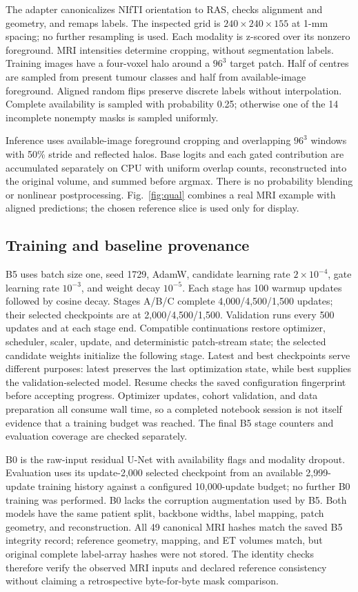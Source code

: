 \documentclass[conference]{IEEEtran}
\begin{document}
The adapter canonicalizes NIfTI orientation to RAS, checks alignment and geometry, and remaps labels. The inspected grid is $240\times240\times155$ at 1-mm spacing; no further resampling is used. Each modality is z-scored over its nonzero foreground. MRI intensities determine cropping, without segmentation labels. Training images have a four-voxel halo around a $96^3$ target patch. Half of centres are sampled from present tumour classes and half from available-image foreground. Aligned random flips preserve discrete labels without interpolation. Complete availability is sampled with probability 0.25; otherwise one of the 14 incomplete nonempty masks is sampled uniformly.

Inference uses available-image foreground cropping and overlapping $96^3$ windows with 50\% stride and reflected halos. Base logits and each gated contribution are accumulated separately on CPU with uniform overlap counts, reconstructed into the original volume, and summed before argmax. There is no probability blending or nonlinear postprocessing. Fig.~\ref{fig:qual} combines a real MRI example with aligned predictions; the chosen reference slice is used only for display.

\subsection{Training and baseline provenance}
B5 uses batch size one, seed 1729, AdamW, candidate learning rate $2\times10^{-4}$, gate learning rate $10^{-3}$, and weight decay $10^{-5}$. Each stage has 100 warmup updates followed by cosine decay. Stages A/B/C complete 4,000/4,500/1,500 updates; their selected checkpoints are at 2,000/4,500/1,500. Validation runs every 500 updates and at each stage end. Compatible continuations restore optimizer, scheduler, scaler, update, and deterministic patch-stream state; the selected candidate weights initialize the following stage. Latest and best checkpoints serve different purposes: latest preserves the last optimization state, while best supplies the validation-selected model. Resume checks the saved configuration fingerprint before accepting progress. Optimizer updates, cohort validation, and data preparation all consume wall time, so a completed notebook session is not itself evidence that a training budget was reached. The final B5 stage counters and evaluation coverage are checked separately.

B0 is the raw-input residual U-Net with availability flags and modality dropout. Evaluation uses its update-2,000 selected checkpoint from an available 2,999-update training history against a configured 10,000-update budget; no further B0 training was performed. B0 lacks the corruption augmentation used by B5. Both models have the same patient split, backbone widths, label mapping, patch geometry, and reconstruction. All 49 canonical MRI hashes match the saved B5 integrity record; reference geometry, mapping, and ET volumes match, but original complete label-array hashes were not stored. The identity checks therefore verify the observed MRI inputs and declared reference consistency without claiming a retrospective byte-for-byte mask comparison.
\end{document}
